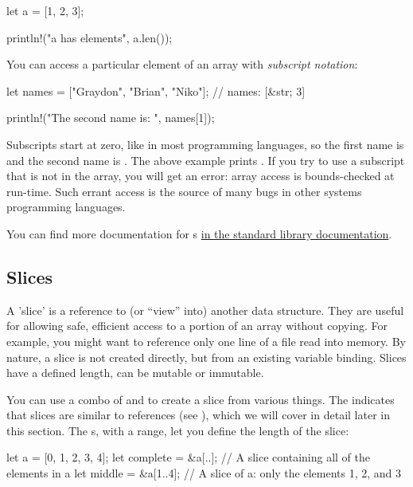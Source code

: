 \begin{rustc}
let a = [1, 2, 3];

println!("a has {} elements", a.len());
\end{rustc}

You can access a particular element of an array with \emph{subscript notation}:

\begin{rustc}
let names = ["Graydon", "Brian", "Niko"]; // names: [&str; 3]

println!("The second name is: {}", names[1]);
\end{rustc}

Subscripts start at zero, like in most programming languages, so the first name is  and the second name is .
The above example prints . If you try to use a subscript that is not in the array, you will get an error:
array access is bounds-checked at run-time. Such errant access is the source of many bugs in other systems programming languages.

\blank

You can find more documentation for s \href{https://doc.rust-lang.org/std/primitive.array.html}{in the standard library
documentation}.

\subsection*{Slices}

A 'slice' is a reference to (or “view” into) another data structure. They are useful for allowing safe, efficient access to a portion 
of an array without copying. For example, you might want to reference only one line of a file read into memory. By nature, a slice is 
not created directly, but from an existing variable binding. Slices have a defined length, can be mutable or immutable.


You can use a combo of \code{\&} and \code{[]} to create a slice from various things. The \code{\&} indicates that slices are similar 
to references (see ), which we will cover in detail later in this section. The \code{[]}s, with 
a range, let you define the length of the slice:

\begin{rustc}
let a = [0, 1, 2, 3, 4];
let complete = &a[..]; // A slice containing all of the elements in a
let middle = &a[1..4]; // A slice of a: only the elements 1, 2, and 3
\end{rustc}

